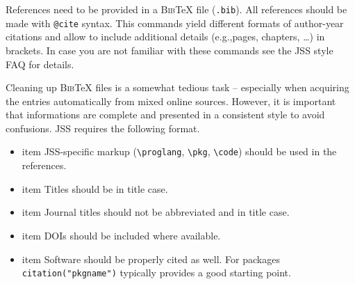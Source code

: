 \documentclass[
  nojss,
  article]{jss}
\providecommand{\tightlist}{%
  \setlength{\itemsep}{0pt}\setlength{\parskip}{0pt}}
\begin{document}
\begin{tcolorbox}[enhanced jigsaw, colframe=quarto-callout-color-frame, colback=white, rightrule=.15mm, toprule=.15mm, breakable, arc=.35mm, bottomrule=.15mm, leftrule=.75mm, left=2mm, opacityback=0]

References need to be provided in a \textsc{Bib}{\TeX} file
(\texttt{.bib}). All references should be made with \texttt{@cite}
syntax. This commands yield different formats of author-year citations
and allow to include additional details (e.g.,pages, chapters, \dots) in
brackets. In case you are not familiar with these commands see the JSS
style FAQ for details.

Cleaning up \textsc{Bib}{\TeX} files is a somewhat tedious task --
especially when acquiring the entries automatically from mixed online
sources. However, it is important that informations are complete and
presented in a consistent style to avoid confusions. JSS requires the
following format.

\begin{itemize}
\tightlist
\item
  item JSS-specific markup (\texttt{\textbackslash{}proglang},
  \texttt{\textbackslash{}pkg}, \texttt{\textbackslash{}code}) should be
  used in the references.
\item
  item Titles should be in title case.
\item
  item Journal titles should not be abbreviated and in title case.
\item
  item DOIs should be included where available.
\item
  item Software should be properly cited as well. For 
  packages \texttt{citation("pkgname")} typically provides a good
  starting point.
\end{itemize}

\end{tcolorbox}
\end{document}
